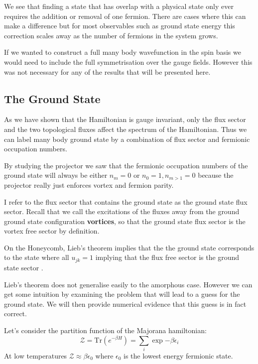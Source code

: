 We see that finding a state that has overlap with a physical state only
ever requires the addition or removal of one fermion. There are cases
where this can make a difference but for most observables such as ground
state energy this correction scales away as the number of fermions in
the system grows.

If we wanted to construct a full many body wavefunction in the spin
basis we would need to include the full symmetrisation over the gauge
fields. However this was not necessary for any of the results that will
be presented here.

\hypertarget{the-ground-state}{%
\subsection{The Ground State}\label{the-ground-state}}

As we have shown that the Hamiltonian is gauge invariant, only the flux
sector and the two topological fluxes affect the spectrum of the
Hamiltonian. Thus we can label many body ground state by a combination
of flux sector and fermionic occupation numbers.

By studying the projector we saw that the fermionic occupation numbers
of the ground state will always be either \(n_m = 0\) or
\(n_0 = 1, n_{m>1} = 0\) because the projector really just enforces
vortex and fermion parity.

I refer to the flux sector that contains the ground state as the ground
state flux sector. Recall that we call the excitations of the fluxes
away from the ground ground state configuration \textbf{vortices}, so
that the ground state flux sector is the vortex free sector by
definition.

On the Honeycomb, Lieb's theorem implies that the the ground state
corresponds to the state where all \(u_{jk} = 1\) implying that the flux
free sector is the ground state sector \textcite{lieb_flux_1994}.

Lieb's theorem does not generalise easily to the amorphous case. However
we can get some intuition by examining the problem that will lead to a
guess for the ground state. We will then provide numerical evidence that
this guess is in fact correct.

Let's consider the partition function of the Majorana hamiltonian:
\[ \mathcal{Z} = \mathrm{Tr}\left( e^{-\beta H}\right) = \sum_i \exp{-\beta \epsilon_i}\]
At low temperatures \(\mathcal{Z} \approx \beta \epsilon_0\) where
\(\epsilon_0\) is the lowest energy fermionic state.

